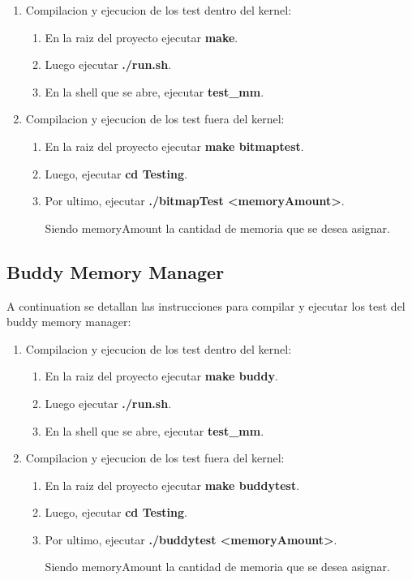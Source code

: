 \documentclass{article}
\begin{document}
\begin{enumerate}

\item Compilacion y ejecucion de los test dentro del kernel:

\begin{enumerate}
    \item En la raiz del proyecto ejecutar \textbf{make}.
    \item Luego ejecutar \textbf{./run.sh}.
    \item En la shell que se abre, ejecutar \textbf{test\_mm}.
\end{enumerate}

\item Compilacion y ejecucion de los test fuera del kernel:

\begin{enumerate}
    \item En la raiz del proyecto ejecutar \textbf{make bitmaptest}.
    \item Luego, ejecutar \textbf{cd Testing}.
    \item Por ultimo, ejecutar \textbf{./bitmapTest \textless memoryAmount\textgreater}. 

    Siendo memoryAmount la cantidad de memoria que se desea asignar.
\end{enumerate}

\end{enumerate}

\subsection {Buddy Memory Manager}


A continuation se detallan las instrucciones para compilar y ejecutar los test del buddy memory manager:

\begin{enumerate}

\item Compilacion y ejecucion de los test dentro del kernel:

\begin{enumerate}
    \item En la raiz del proyecto ejecutar \textbf{make buddy}.
    \item Luego ejecutar \textbf{./run.sh}.
    \item En la shell que se abre, ejecutar \textbf{test\_mm}.
    
\end{enumerate}

\item Compilacion y ejecucion de los test fuera del kernel:

\begin{enumerate}
    \item En la raiz del proyecto ejecutar \textbf{make buddytest}.
    \item Luego, ejecutar \textbf{cd Testing}.
    \item Por ultimo, ejecutar \textbf{./buddytest <memoryAmount>}.

    Siendo memoryAmount la cantidad de memoria que se desea asignar.
\end{enumerate}

\end{enumerate}
\end{document}
